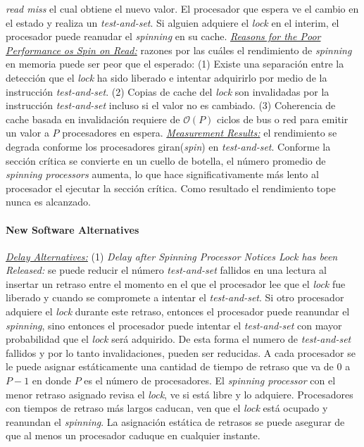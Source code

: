 \textit{read miss} el cual obtiene el nuevo valor. El procesador que espera ve el cambio en el estado y realiza un \textit{test-and-set}. Si alguien adquiere el \textit{lock} en el interim, el procesador puede reanudar el \textit{spinning} en su cache. \underline{\textit{Reasons for the Poor Performance os Spin on Read:}} razones por las cuáles el rendimiento de \textit{spinning} en memoria puede ser peor que el esperado: (1) Existe una separación entre la detección que el \textit{lock} ha sido liberado e intentar adquirirlo por medio de la instrucción \textit{test-and-set}. (2) Copias de cache del \textit{lock} son invalidadas por la instrucción \textit{test-and-set} incluso si el valor no es cambiado. (3) Coherencia de cache basada en invalidación requiere de $\mathcal{O}(P)$ ciclos de bus o red para emitir un valor a $P$ procesadores en espera. \underline{\textit{Measurement Results:}} el rendimiento se degrada conforme los procesadores giran(\textit{spin}) en \textit{test-and-set}. Conforme la sección crítica se convierte en un cuello de botella, el número promedio de \textit{spinning processors} aumenta, lo que hace significativamente más lento al procesador el ejecutar la sección crítica. Como resultado el rendimiento tope nunca es alcanzado.

\paragraph{\textnormal{\textbf{New Software Alternatives}}}
\underline{\textit{Delay Alternatives:}} (1) \textit{Delay after Spinning Processor Notices Lock has been Released:} se puede reducir el número \textit{test-and-set} fallidos en una lectura al insertar un retraso entre el momento en el que el procesador lee que el \textit{lock} fue liberado y cuando se compromete a intentar el \textit{test-and-set}. Si otro procesador adquiere el \textit{lock} durante este retraso, entonces el procesador puede reanundar el \textit{spinning}, sino entonces el procesador puede intentar el \textit{test-and-set} con mayor probabilidad que el \textit{lock} será adquirido. De esta forma el numero de \textit{test-and-set} fallidos y por lo tanto invalidaciones, pueden ser reducidas. A cada procesador se le puede asignar estáticamente una cantidad de tiempo de retraso que va de $0$ a $P - 1$ en donde $P$ es el número de procesadores. El \textit{spinning processor} con el menor retraso asignado revisa el \textit{lock}, ve si está libre y lo adquiere. Procesadores con tiempos de retraso más largos   caducan, ven que el \textit{lock} está ocupado y reanundan el \textit{spinning}. La asignación estática de retrasos se puede asegurar de que al menos un procesador caduque en cualquier instante.

